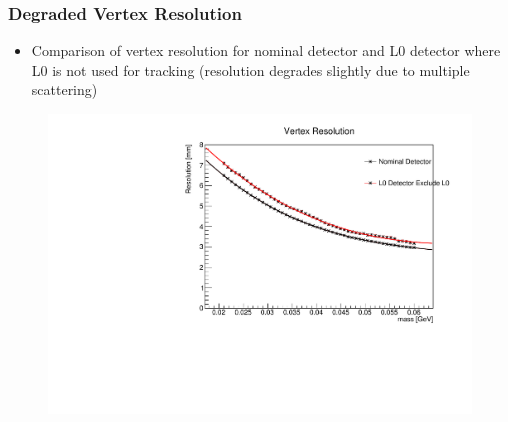 \documentclass{beamer}
\begin{document}

\begin{frame}
\frametitle{Degraded Vertex Resolution}
\begin{itemize}
\item Comparison of vertex resolution for nominal detector and L0 detector where L0 is not used for tracking (resolution degrades slightly due to multiple scattering)
\end{itemize}
\begin{figure}
\includegraphics[width=0.65\linewidth]{figs/VZ_Resolution.pdf}
\end{figure}

\end{frame}

\end{document}
